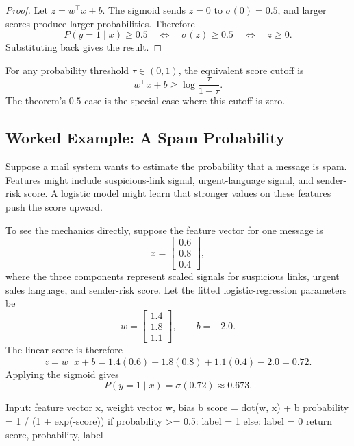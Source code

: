 \begin{proof}
Let $z = w^\top x + b$. The sigmoid sends $z=0$ to $\sigma(0)=0.5$, and larger scores produce larger probabilities. Therefore
\[
P(y=1 \mid x) \ge 0.5
\quad \Longleftrightarrow \quad
\sigma(z) \ge 0.5
\quad \Longleftrightarrow \quad
z \ge 0.
\]
Substituting back gives the result.
\end{proof}

\begin{mathlens}
For any probability threshold $\tau \in (0,1)$, the equivalent score cutoff is
\[
w^\top x + b \ge \log\frac{\tau}{1-\tau}.
\]
The theorem's $0.5$ case is the special case where this cutoff is zero.
\end{mathlens}

\subsection{Worked Example: A Spam Probability}

Suppose a mail system wants to estimate the probability that a message is spam. Features might include suspicious-link signal, urgent-language signal, and sender-risk score. A logistic model might learn that stronger values on these features push the score upward.

To see the mechanics directly, suppose the feature vector for one message is
\[
x =
\begin{bmatrix}
0.6 \\
0.8 \\
0.4
\end{bmatrix},
\]
where the three components represent scaled signals for suspicious links, urgent sales language, and sender-risk score. Let the fitted logistic-regression parameters be
\[
w =
\begin{bmatrix}
1.4 \\
1.8 \\
1.1
\end{bmatrix},
\qquad
b=-2.0.
\]
The linear score is therefore
\[
z = w^\top x + b = 1.4(0.6) + 1.8(0.8) + 1.1(0.4) - 2.0 = 0.72.
\]
Applying the sigmoid gives
\[
P(y=1 \mid x) = \sigma(0.72) \approx 0.673.
\]

\begin{codeexample}[caption={Algorithm sketch: logistic score and probability}]
Input: feature vector x, weight vector w, bias b
score = dot(w, x) + b
probability = 1 / (1 + exp(-score))
if probability >= 0.5:
    label = 1
else:
    label = 0
return score, probability, label
\end{codeexample}

